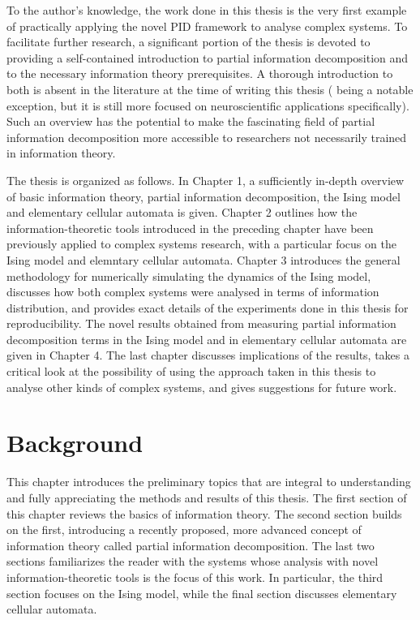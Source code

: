 \documentclass[12pt]{article}
\begin{document}
To the author's knowledge, the work done in this thesis is the very first example of practically applying the novel PID framework to analyse complex systems. To facilitate further research, a significant portion of the thesis is devoted to providing a self-contained introduction to partial information decomposition and to the necessary information theory prerequisites. A thorough introduction to both is absent in the literature at the time of writing this thesis (\cite{bits-from-brains} being a notable exception, but it is still more focused on neuroscientific applications specifically). Such an overview has the potential to make the fascinating field of partial information decomposition more accessible to researchers not necessarily trained in information theory.  

The thesis is organized as follows. In Chapter 1, a sufficiently in-depth overview of basic information theory, partial information decomposition, the Ising model and elementary cellular automata is given. Chapter 2 outlines how the information-theoretic tools introduced in the preceding chapter have been previously applied to complex systems research, with a particular focus on the Ising model and elemntary cellular automata. Chapter 3 introduces the general methodology for numerically simulating the dynamics of the Ising model, discusses how both complex systems were analysed in terms of information distribution, and provides exact details of the experiments done in this thesis for reproducibility. The novel results obtained from measuring partial information decomposition terms in the Ising model and in elementary cellular automata are given in Chapter 4. The last chapter discusses implications of the results, takes a critical look at the possibility of using the approach taken in this thesis to analyse other kinds of complex systems, and gives suggestions for future work.  

\newpage

\section{Background}

This chapter introduces the preliminary topics that are integral to understanding and fully appreciating the methods and results of this thesis. The first section of this chapter reviews the basics of information theory. The second section builds on the first, introducing a recently proposed, more advanced concept of information theory called partial information decomposition. The last two sections familiarizes the reader with the systems whose analysis with novel information-theoretic tools is the focus of this work. In particular, the third section focuses on the Ising model, while the final section discusses elementary cellular automata.
\end{document}
